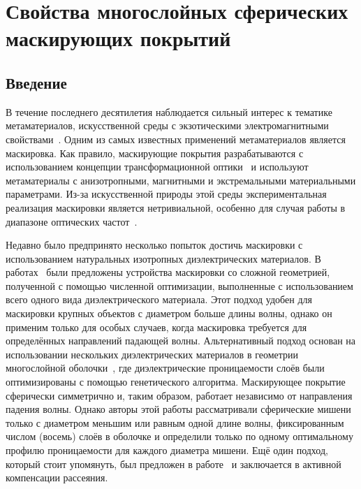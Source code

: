 \chapter{Свойства многослойных сферических маскирующих
  покрытий} \label{chapt3}
\section{Введение}
В течение последнего десятилетия наблюдается сильный интерес к
тематике метаматериалов, искусственной среды с экзотическими
электромагнитными свойствами~\cite{Smith-2004,
  Schurig-2006, Shalaev-2007, Kivshar-2012}. Одним из самых известных
применений метаматериалов является маскировка. Как правило,
маскирующие покрытия разрабатываются с использованием концепции
трансформационной оптики~\cite{pendry_TO, Leonhardt-2006} и
используют метаматериалы с анизотропными, магнитными и экстремальными
материальными параметрами. Из-за искусственной природы этой среды
экспериментальная реализация маскировки является нетривиальной,
особенно для случая работы в диапазоне оптических
частот~\cite{Kildishev:2011, alu, XU-Su:120408, Alu-2005}. 

Недавно было предпринято несколько попыток достичь маскировки с
использованием натуральных изотропных диэлектрических материалов. В
работах~\cite{Sigmund-AllDiel-2011, smith-3dprinterCloak-2013,
  Fujii_topolOpti_theory_2013,
  ma-experiment-topology-2013,LayeredShell,MOP:MOP27024} были
предложены устройства маскировки со сложной геометрией, полученной
с помощью численной оптимизации, выполненные с использованием всего
одного вида диэлектрического материала.  Этот подход удобен для
маскировки крупных объектов с диаметром больше длины волны, однако он
применим только для особых случаев, когда маскировка требуется для
определённых направлений падающей волны. Альтернативный подход основан
на использовании нескольких диэлектрических материалов в геометрии
многослойной оболочки~\cite{Semouchkina-2013, semouchkina2}, где
диэлектрические проницаемости слоёв были оптимизированы с помощью
генетического алгоритма. Маскирующее покрытие сферически симметрично
и, таким образом, работает независимо от направления падения
волны. Однако авторы этой работы рассматривали сферические
мишени только с диаметром меньшим или равным одной длине волны,
фиксированным числом (восемь) слоёв в оболочке и определили только по
одному оптимальному профилю проницаемости для каждого диаметра мишени.
Ещё один подход, который стоит упомянуть, был предложен в
работе~\cite{Elefteriades_ActiveCloak_2013} и заключается в активной
компенсации рассеяния.

